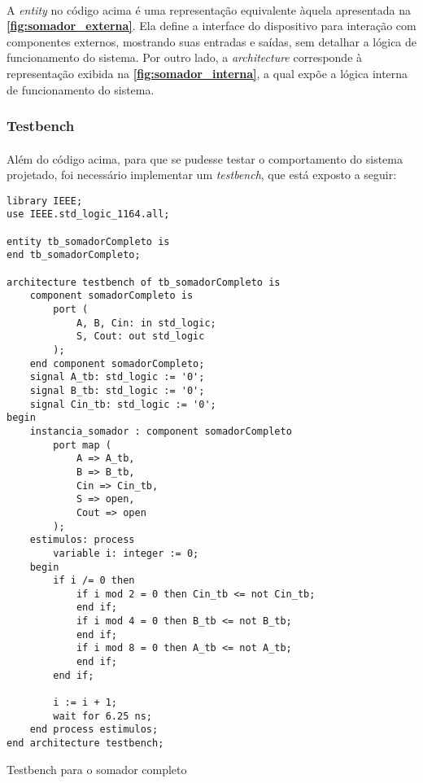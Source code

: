 \documentclass[a4paper,12pt]{article}
\newenvironment{code}{\captionsetup{type=listing}}{}
\begin{document}
\paragraph{}
A \textit{entity} no código acima é uma representação equivalente àquela apresentada na \textbf{\autoref{fig:somador_externa}}. Ela define a interface do dispositivo para interação com componentes externos, mostrando suas entradas e saídas, sem detalhar a lógica de funcionamento do sistema. Por outro lado, a \textit{architecture} corresponde à representação exibida na \textbf{\autoref{fig:somador_interna}}, a qual expõe a lógica interna de funcionamento do sistema.

\newpage

\subsubsection{Testbench}
\paragraph{}
Além do código acima, para que se pudesse testar o comportamento do sistema projetado, foi necessário implementar um \textit{testbench}, que está exposto a seguir:

\begin{code}
\begin{verbatim}
library IEEE;
use IEEE.std_logic_1164.all;

entity tb_somadorCompleto is
end tb_somadorCompleto;

architecture testbench of tb_somadorCompleto is
    component somadorCompleto is
        port (
            A, B, Cin: in std_logic;
            S, Cout: out std_logic
        );
    end component somadorCompleto;
    signal A_tb: std_logic := '0';
    signal B_tb: std_logic := '0';
    signal Cin_tb: std_logic := '0';
begin
    instancia_somador : component somadorCompleto 
        port map (
            A => A_tb,
            B => B_tb,
            Cin => Cin_tb,
            S => open,
            Cout => open
        );
    estimulos: process
        variable i: integer := 0;
    begin
        if i /= 0 then
            if i mod 2 = 0 then Cin_tb <= not Cin_tb;
            end if;
            if i mod 4 = 0 then B_tb <= not B_tb;
            end if;
            if i mod 8 = 0 then A_tb <= not A_tb;
            end if;
        end if;

        i := i + 1;
        wait for 6.25 ns;
    end process estimulos;
end architecture testbench;
\end{verbatim}
\caption{Testbench para o somador completo}
\end{code}
\end{document}
